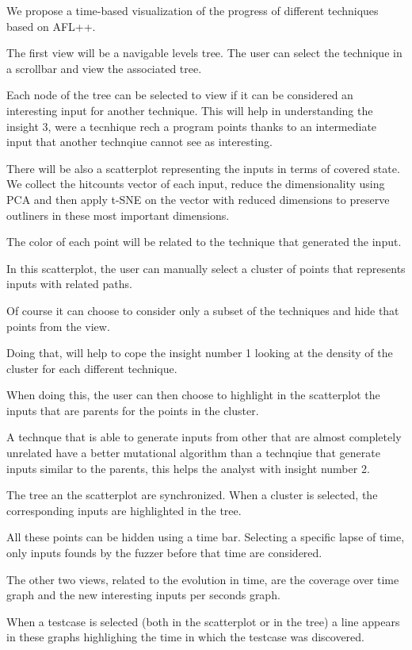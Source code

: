 \documentclass[conference,compsoc]{IEEEtran}
\begin{document}
We propose a time-based visualization of the progress of different techniques based on {\sc AFL++}.

The first view will be a navigable levels tree. The user can select the technique in a scrollbar and view the associated tree.

Each node of the tree can be selected to view if it can be considered an interesting input for another technique. This will help in understanding the insight 3, were a tecnhique rech a program points thanks to an intermediate input that another technqiue cannot see as interesting.

There will be also a scatterplot representing the inputs in terms of covered state.
We collect the hitcounts vector of each input, reduce the dimensionality using PCA and then apply t-SNE on the vector with reduced dimensions to preserve outliners in these most important dimensions.

The color of each point will be related to the technique that generated the input.

In this scatterplot, the user can manually select a cluster of points that represents inputs with related paths.

Of course it can choose to consider only a subset of the techniques and hide that points from the view.

Doing that, will help to cope the insight number 1 looking at the density of the cluster for each different technique.

When doing this, the user can then choose to highlight in the scatterplot the inputs that are parents for the points in the cluster.

A technque that is able to generate inputs from other that are almost completely unrelated have a better mutational algorithm than a technqiue that generate inputs similar to the parents, this helps the analyst with insight number 2.

The tree an the scatterplot are synchronized. When a cluster is selected, the corresponding inputs are highlighted in the tree.

All these points can be hidden using a time bar. Selecting a specific lapse of time, only inputs founds by the fuzzer before that time are considered.

The other two views, related to the evolution in time, are the coverage over time graph and the new interesting inputs per seconds graph.

When a testcase is selected (both in the scatterplot or in the tree) a line appears in these graphs highlighing the time in which the testcase was discovered.
\end{document}
